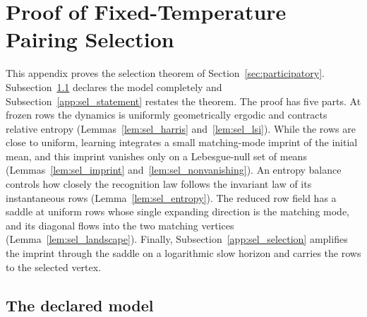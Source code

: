\clearpage
\section{Proof of Fixed-Temperature Pairing Selection}\label{app:selection_proof}

This appendix proves the selection theorem of Section~\ref{sec:participatory}. Subsection~\ref{app:sel_model} declares the model completely and Subsection~\ref{app:sel_statement} restates the theorem. The proof has five parts. At frozen rows the dynamics is uniformly geometrically ergodic and contracts relative entropy (Lemmas~\ref{lem:sel_harris} and~\ref{lem:sel_lsi}). While the rows are close to uniform, learning integrates a small matching-mode imprint of the initial mean, and this imprint vanishes only on a Lebesgue-null set of means (Lemmas~\ref{lem:sel_imprint} and~\ref{lem:sel_nonvanishing}). An entropy balance controls how closely the recognition law follows the invariant law of its instantaneous rows (Lemma~\ref{lem:sel_entropy}). The reduced row field has a saddle at uniform rows whose single expanding direction is the matching mode, and its diagonal flows into the two matching vertices (Lemma~\ref{lem:sel_landscape}). Finally, Subsection~\ref{app:sel_selection} amplifies the imprint through the saddle on a logarithmic slow horizon and carries the rows to the selected vertex.

\subsection{The declared model}\label{app:sel_model}

